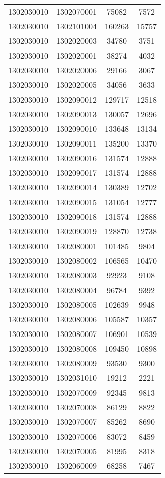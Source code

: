 \begin{longtable}{llcc}
1302030010 & 1302070001 & 75082 & 7572\\
1302030010 & 1302101004 & 160263 & 15757\\
1302030010 & 1302020003 & 34780 & 3751\\
1302030010 & 1302020001 & 38274 & 4032\\
1302030010 & 1302020006 & 29166 & 3067\\
1302030010 & 1302020005 & 34056 & 3633\\
1302030010 & 1302090012 & 129717 & 12518\\
1302030010 & 1302090013 & 130057 & 12696\\
1302030010 & 1302090010 & 133648 & 13134\\
1302030010 & 1302090011 & 135200 & 13370\\
1302030010 & 1302090016 & 131574 & 12888\\
1302030010 & 1302090017 & 131574 & 12888\\
1302030010 & 1302090014 & 130389 & 12702\\
1302030010 & 1302090015 & 131054 & 12777\\
1302030010 & 1302090018 & 131574 & 12888\\
1302030010 & 1302090019 & 128870 & 12738\\
1302030010 & 1302080001 & 101485 & 9804\\
1302030010 & 1302080002 & 106565 & 10470\\
1302030010 & 1302080003 & 92923 & 9108\\
1302030010 & 1302080004 & 96784 & 9392\\
1302030010 & 1302080005 & 102639 & 9948\\
1302030010 & 1302080006 & 105587 & 10357\\
1302030010 & 1302080007 & 106901 & 10539\\
1302030010 & 1302080008 & 109450 & 10898\\
1302030010 & 1302080009 & 93530 & 9300\\
1302030010 & 1302031010 & 19212 & 2221\\
1302030010 & 1302070009 & 92345 & 9813\\
1302030010 & 1302070008 & 86129 & 8822\\
1302030010 & 1302070007 & 85262 & 8690\\
1302030010 & 1302070006 & 83072 & 8459\\
1302030010 & 1302070005 & 81995 & 8318\\
1302030010 & 1302060009 & 68258 & 7467\\

\end{longtable}
